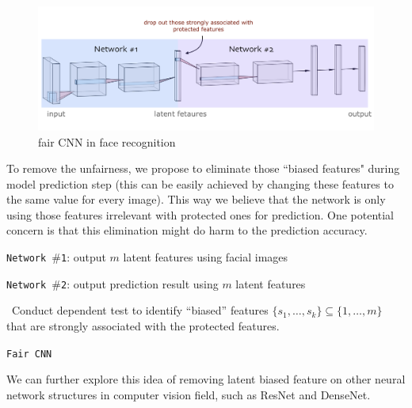 \documentclass{article}
\begin{document}
\begin{figure}[H]
	\centering
	\includegraphics[width=1\textwidth]{figure/group_fair_new.png}
	\caption{fair CNN in face recognition}
	\label{fig: 2}
\end{figure}


To remove the unfairness, we propose to eliminate those ``biased features" during model prediction step (this can be easily achieved by changing these features to the same value for every image). This way we believe that the network is only using those features irrelevant with protected ones for prediction. One potential concern is that this elimination might do harm to the prediction accuracy.




\begin{algorithm}[H]
	\texttt{Network $\#$1}: output $m$ latent features using facial images
	
	\texttt{Network $\#$2}: output prediction result using $m$ latent features
	
	
	\ Conduct dependent test to identify ``biased'' features $\{s_1, \dots, s_k\} \subseteq \{1, \dots, m\}$ that are strongly associated with the protected features.
	
	\caption{\texttt{Fair CNN}}
\end{algorithm}






We can further explore this idea of removing latent biased feature on other neural network structures in computer vision field, such as ResNet and DenseNet.
\end{document}
